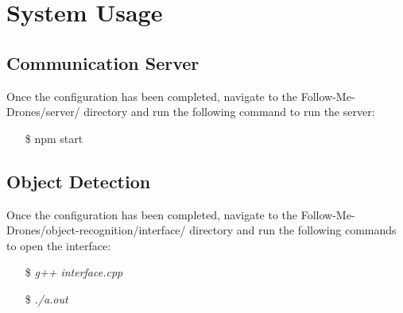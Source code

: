 \chapter{System Usage}

\section{Communication Server}

Once the configuration has been completed, navigate to the Follow-Me-Drones/server/ directory and run the following command to run the server:
\begin{itemize}
    \item[\$] npm start
\end{itemize}

\section{Object Detection}

Once the configuration has been completed, navigate to the Follow-Me-Drones/object-recognition/interface/ directory and run the following commands to open the interface:
\begin{itemize}
    \item[\$] \textit{g++ interface.cpp}
    \item[\$] \textit{./a.out}
\end{itemize}


